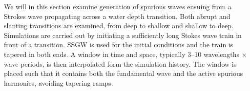 %
%
%
%
%
%
%

We will in this section examine generation of spurious waves ensuing from a Strokes wave propagating across a water depth transition. Both abrupt and slanting transitions are examined, from deep to shallow and shallow to deep.
Simulations are carried out by initiating a sufficiently long Stokes wave train in front of a transition.  
SSGW is used for the initial conditions and the train is tapered in both ends.
A window in time and space, typically 3--10 wavelengths $\times$ wave periods, is then interpolated form the simulation history. The window is placed such that it contains both the fundamental wave and the active spurious harmonics, avoiding tapering ramps.\\

